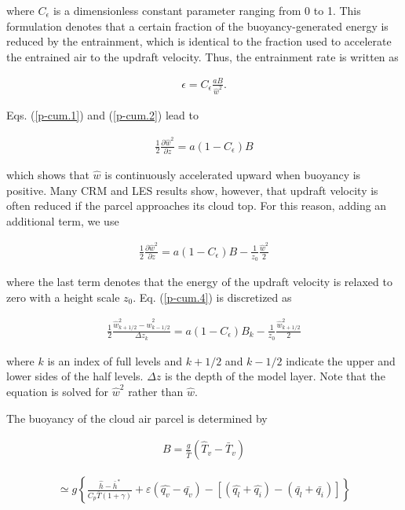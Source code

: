 where \(C_\epsilon\) is a dimensionless constant parameter ranging from 0 to 1. This formulation denotes that a certain fraction of the buoyancy-generated energy is reduced by the entrainment, which
is identical to the fraction used to accelerate the entrained air to the updraft velocity. Thus, the entrainment rate is written as

\begin{eqnarray}
 \epsilon = C_\epsilon\frac{aB}{\hat{w}^2}. \label{p-cum.2}
\end{eqnarray}

Eqs. (\ref{p-cum.1}) and (\ref{p-cum.2}) lead to

\begin{eqnarray}
 \frac{1}{2}\frac{\partial \hat{w}^2}{\partial z} = a(1 - C_\epsilon) B
\end{eqnarray}

which shows that \(\hat{w}\) is continuously accelerated upward when buoyancy is positive. Many CRM and LES results show, however, that updraft velocity is often reduced if the parcel approaches its
cloud top. For this reason, adding an additional term, we use

\begin{eqnarray}
 \frac{1}{2}\frac{\partial \hat{w}^2}{\partial z} = a(1 - C_\epsilon) B - \frac{1}{z_0}\frac{\hat{w}^2}{2}\label{p-cum.4}
\end{eqnarray}

where the last term denotes that the energy of the updraft velocity is relaxed to zero with a height scale \(z_0\). Eq. (\ref{p-cum.4}) is discretized as

\begin{eqnarray}
 \frac{1}{2}\frac{\hat{w}^2_{k+1/2} - \hat{w}^2_{k-1/2}}{\Delta z_k} = a(1 - C_\epsilon) B_k - \frac{1}{z_0}\frac{\hat{w}_{k+1/2}^2}{2} \label{p-cum.A5}
\end{eqnarray}

where \(k\) is an index of full levels and \(k+1/2\) and \(k-1/2\) indicate the upper and lower sides of the half levels. \(\Delta z\) is the depth of the model layer. Note that the equation is solved
for \(\hat{w}^2\) rather than \(\hat{w}\).

The buoyancy of the cloud air parcel is determined by

\begin{eqnarray}
 B  =   \frac{g}{\bar{T}} ( \hat{T}_v - \bar{T}_v )
\end{eqnarray}

\begin{eqnarray}
 \simeq g \left\{ \frac{\hat{h} - \bar{h}^*}{C_p \bar{T}(1 + \gamma)} + \varepsilon(\hat{q_v}-\bar{q_v}) - \left[ (\hat{q_l}+\hat{q_i}) - (\bar{q_l}+\bar{q_i}) \right] \right\}
\end{eqnarray}

